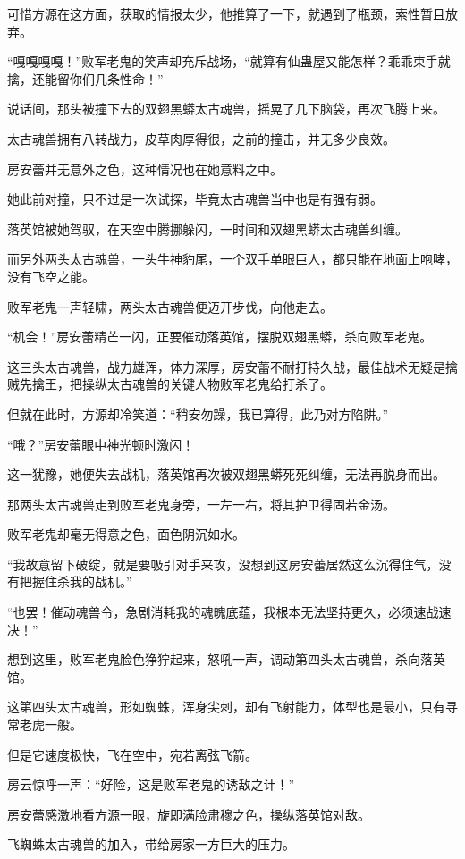 \begin{this_body}
可惜方源在这方面，获取的情报太少，他推算了一下，就遇到了瓶颈，索性暂且放弃。

“嘎嘎嘎嘎！”败军老鬼的笑声却充斥战场，“就算有仙蛊屋又能怎样？乖乖束手就擒，还能留你们几条性命！”

说话间，那头被撞下去的双翅黑蟒太古魂兽，摇晃了几下脑袋，再次飞腾上来。

太古魂兽拥有八转战力，皮草肉厚得很，之前的撞击，并无多少良效。

房安蕾并无意外之色，这种情况也在她意料之中。

她此前对撞，只不过是一次试探，毕竟太古魂兽当中也是有强有弱。

落英馆被她驾驭，在天空中腾挪躲闪，一时间和双翅黑蟒太古魂兽纠缠。

而另外两头太古魂兽，一头牛神豹尾，一个双手单眼巨人，都只能在地面上咆哮，没有飞空之能。

败军老鬼一声轻啸，两头太古魂兽便迈开步伐，向他走去。

“机会！”房安蕾精芒一闪，正要催动落英馆，摆脱双翅黑蟒，杀向败军老鬼。

这三头太古魂兽，战力雄浑，体力深厚，房安蕾不耐打持久战，最佳战术无疑是擒贼先擒王，把操纵太古魂兽的关键人物败军老鬼给打杀了。

但就在此时，方源却冷笑道：“稍安勿躁，我已算得，此乃对方陷阱。”

“哦？”房安蕾眼中神光顿时激闪！

这一犹豫，她便失去战机，落英馆再次被双翅黑蟒死死纠缠，无法再脱身而出。

那两头太古魂兽走到败军老鬼身旁，一左一右，将其护卫得固若金汤。

败军老鬼却毫无得意之色，面色阴沉如水。

“我故意留下破绽，就是要吸引对手来攻，没想到这房安蕾居然这么沉得住气，没有把握住杀我的战机。”

“也罢！催动魂兽令，急剧消耗我的魂魄底蕴，我根本无法坚持更久，必须速战速决！”

想到这里，败军老鬼脸色狰狞起来，怒吼一声，调动第四头太古魂兽，杀向落英馆。

这第四头太古魂兽，形如蜘蛛，浑身尖刺，却有飞射能力，体型也是最小，只有寻常老虎一般。

但是它速度极快，飞在空中，宛若离弦飞箭。

房云惊呼一声：“好险，这是败军老鬼的诱敌之计！”

房安蕾感激地看方源一眼，旋即满脸肃穆之色，操纵落英馆对敌。

飞蜘蛛太古魂兽的加入，带给房家一方巨大的压力。


\end{this_body}
